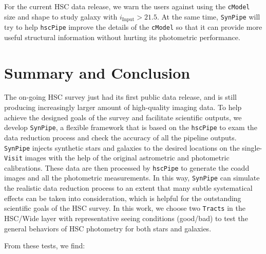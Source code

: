 \documentclass[useamsfonts]{pasj01}
\def\hscpipe{\texttt{hscPipe}}
\def\synpipe{\texttt{SynPipe}}
\def\cmodel{\texttt{cModel}}
\def\visit{\texttt{Visit}}
\def\tracts{\texttt{Tracts}}
\begin{document}
    For the current HSC data release, we warn the users against using the \cmodel{} 
    size and shape to study galaxy with $i_{\mathrm{Input}}>21.5$. 
    At the same time, \synpipe{} will try to help \hscpipe{} improve the details 
    of the \cmodel{} so that it can provide more useful structural information without
    hurting its photometric performance.  
    

\section{Summary and Conclusion}
    \label{sec:summary}

    The on-going HSC survey just had its first public data release, and is still
    producing increasingly larger amount of high-quality imaging data.
    To help achieve the designed goals of the survey and facilitate scientific
    outputs, we develop \synpipe{}, a flexible framework that is based on the
    \hscpipe{} to exam the data reduction process and check the accuracy of all the
    pipeline outputs.
    \synpipe{} injects synthetic stars and galaxies to the desired locations on the
    single-\visit{} images with the help of the original astrometric and
    photometric calibrations.
    These data are then processed by \hscpipe{} to generate the coadd images and
    all the photometric measurements.
    In this way, \synpipe{} can simulate the realistic data reduction process
    to an extent that many subtle systematical effects can be taken into
    consideration, which is helpful for the outstanding scientific goals of the HSC
    survey.
    In this work, we choose two \tracts{} in the HSC/Wide layer with
    representative seeing conditions (good/bad) to test the general behaviors of HSC
    photometry for both stars and galaxies.

    From these tests, we find:
\end{document}
